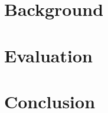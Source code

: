 \documentclass[10pt,journal,compsoc]{IEEEtran}
\begin{document}
\maketitle


\IEEEdisplaynontitleabstractindextext
\IEEEpeerreviewmaketitle


\balance



\section{Background}\label{sec:methodology}


\section{Evaluation}\label{sec:evaluation}



\begin{comment}
\section{Future Work}

Our results suggest a number of areas for future work: (1) we need to evaluate the existing polyhedral optimizations to determine why they do not benefit $\approx \frac{1}{3}$ of the Polybench tests.  We expect we will use detailed study of PMEM behavior to better understand the impact on data locality.  (2) We anticipate better understanding of dataset partitioning across multiple caching layers with different optimization functions could yield better insights into developing memory optimization tools. (3) We theorize that memory optimizaiton tools should provide multiple potential implementations optimized to explit specific memory topologies.  (4) We propose developing a DAX-optimized file system that focuses on providing optimal performance of PMEM as well as application sharing, dynamic allocation, and security focused on maximizing performance of applications using PMEM via the DAX model.
\end{comment}

\section{Conclusion}
\end{document}

